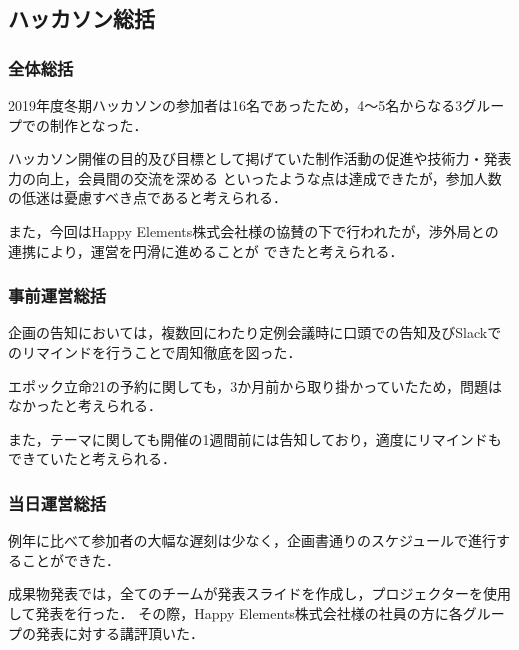\subsection*{ハッカソン総括}


\subsubsection*{全体総括}

2019年度冬期ハッカソンの参加者は16名であったため，4〜5名からなる3グループでの制作となった．

ハッカソン開催の目的及び目標として掲げていた制作活動の促進や技術力・発表力の向上，会員間の交流を深める
といったような点は達成できたが，参加人数の低迷は憂慮すべき点であると考えられる．

また，今回はHappy Elements株式会社様の協賛の下で行われたが，渉外局との連携により，運営を円滑に進めることが
できたと考えられる．

\subsubsection*{事前運営総括}

企画の告知においては，複数回にわたり定例会議時に口頭での告知及びSlackでのリマインドを行うことで周知徹底を図った．

エポック立命21の予約に関しても，3か月前から取り掛かっていたため，問題はなかったと考えられる．

また，テーマに関しても開催の1週間前には告知しており，適度にリマインドもできていたと考えられる．

\subsubsection*{当日運営総括}

例年に比べて参加者の大幅な遅刻は少なく，企画書通りのスケジュールで進行することができた．

成果物発表では，全てのチームが発表スライドを作成し，プロジェクターを使用して発表を行った．
その際，Happy Elements株式会社様の社員の方に各グループの発表に対する講評頂いた．

